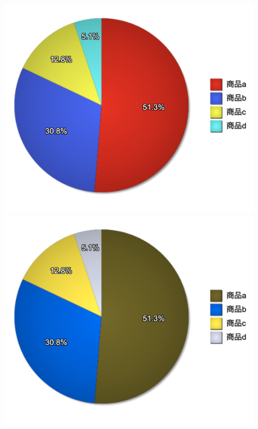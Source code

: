\begin{figure}[H]
\begin{minipage}[b]{.23\textwidth}
    \end{minipage}
    \begin{minipage}[b]{.23\textwidth}
        \centering
        \includegraphics[keepaspectratio,width=\textwidth]{../../10_UniversalDesign/no2_circle_reviced.png}
    \end{minipage}
    \begin{minipage}[b]{.23\textwidth}
        \centering
        \includegraphics[keepaspectratio,width=\textwidth]{../../10_UniversalDesign/no2_circle_RC_P.png}

\end{minipage}
\end{figure}
